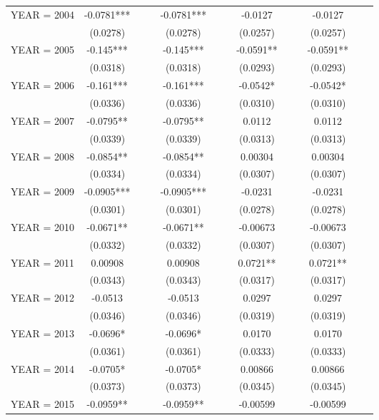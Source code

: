 \begin{tabular}{lcccccccccccc}
YEAR = 2004 & -0.0781*** &  &  & -0.0781*** &  &  & -0.0127 &  &  & -0.0127 &  &  \\
 & (0.0278) &  &  & (0.0278) &  &  & (0.0257) &  &  & (0.0257) &  &  \\
YEAR = 2005 & -0.145*** &  &  & -0.145*** &  &  & -0.0591** &  &  & -0.0591** &  &  \\
 & (0.0318) &  &  & (0.0318) &  &  & (0.0293) &  &  & (0.0293) &  &  \\
YEAR = 2006 & -0.161*** &  &  & -0.161*** &  &  & -0.0542* &  &  & -0.0542* &  &  \\
 & (0.0336) &  &  & (0.0336) &  &  & (0.0310) &  &  & (0.0310) &  &  \\
YEAR = 2007 & -0.0795** &  &  & -0.0795** &  &  & 0.0112 &  &  & 0.0112 &  &  \\
 & (0.0339) &  &  & (0.0339) &  &  & (0.0313) &  &  & (0.0313) &  &  \\
YEAR = 2008 & -0.0854** &  &  & -0.0854** &  &  & 0.00304 &  &  & 0.00304 &  &  \\
 & (0.0334) &  &  & (0.0334) &  &  & (0.0307) &  &  & (0.0307) &  &  \\
YEAR = 2009 & -0.0905*** &  &  & -0.0905*** &  &  & -0.0231 &  &  & -0.0231 &  &  \\
 & (0.0301) &  &  & (0.0301) &  &  & (0.0278) &  &  & (0.0278) &  &  \\
YEAR = 2010 & -0.0671** &  &  & -0.0671** &  &  & -0.00673 &  &  & -0.00673 &  &  \\
 & (0.0332) &  &  & (0.0332) &  &  & (0.0307) &  &  & (0.0307) &  &  \\
YEAR = 2011 & 0.00908 &  &  & 0.00908 &  &  & 0.0721** &  &  & 0.0721** &  &  \\
 & (0.0343) &  &  & (0.0343) &  &  & (0.0317) &  &  & (0.0317) &  &  \\
YEAR = 2012 & -0.0513 &  &  & -0.0513 &  &  & 0.0297 &  &  & 0.0297 &  &  \\
 & (0.0346) &  &  & (0.0346) &  &  & (0.0319) &  &  & (0.0319) &  &  \\
YEAR = 2013 & -0.0696* &  &  & -0.0696* &  &  & 0.0170 &  &  & 0.0170 &  &  \\
 & (0.0361) &  &  & (0.0361) &  &  & (0.0333) &  &  & (0.0333) &  &  \\
YEAR = 2014 & -0.0705* &  &  & -0.0705* &  &  & 0.00866 &  &  & 0.00866 &  &  \\
 & (0.0373) &  &  & (0.0373) &  &  & (0.0345) &  &  & (0.0345) &  &  \\
YEAR = 2015 & -0.0959** &  &  & -0.0959** &  &  & -0.00599 &  &  & -0.00599 &  &  \\

\end{tabular}
